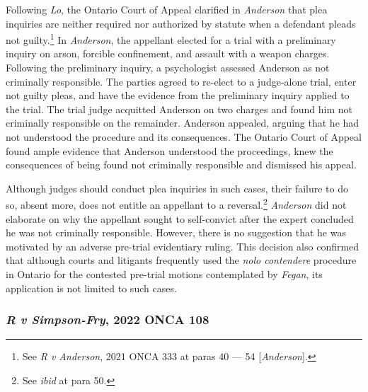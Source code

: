 Following \textit{Lo}, the Ontario Court of Appeal clarified in \textit{Anderson} that plea inquiries are neither required nor authorized by statute when a defendant pleads not guilty.\footnote{See \textit{R v Anderson}, 2021 ONCA 333 at paras 40 — 54 [\textit{Anderson}].} In \textit{Anderson}, the appellant elected for a trial with a preliminary inquiry on arson, forcible confinement, and assault with a weapon charges. Following the preliminary inquiry, a psychologist assessed Anderson as not criminally responsible. The parties agreed to re-elect to a judge-alone trial, enter not guilty pleas, and have the evidence from the preliminary inquiry applied to the trial. The trial judge acquitted Anderson on two charges and found him not criminally responsible on the remainder. Anderson appealed, arguing that he had not understood the procedure and its consequences. The Ontario Court of Appeal found ample evidence that Anderson understood the proceedings, knew the consequences of being found not criminally responsible and dismissed his appeal. 

Although judges should conduct plea inquiries in such cases, their failure to do so, absent more, does not entitle an appellant to a reversal.\footnote{See \textit{ibid} at para 50.} \textit{Anderson} did not elaborate on why the appellant sought to self-convict after the expert concluded he was not criminally responsible. However, there is no suggestion that he was motivated by an adverse pre-trial evidentiary ruling. This decision also confirmed that although courts and litigants frequently used the \textit{nolo contendere} procedure in Ontario for the contested pre-trial motions contemplated by \textit{Fegan}, its application is not limited to such cases.

\subsubsection{\textit{R v Simpson-Fry}, 2022 ONCA 108}

